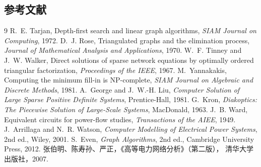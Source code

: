 \subsection{参考文献}
{\renewcommand{\section}[2]{}%
\begin{thebibliography}{9}\small
{} R.~E. Tarjan, Depth-first search and linear graph algorithms,
\emph{SIAM Journal on Computing}, 1972.
 D.~J. Rose, Triangulated graphs and the elimination process,
\emph{Journal of Mathematical Analysis and Applications}, 1970.
 W.~F. Tinney and J.~W. Walker, Direct solutions of sparse
network equations by optimally ordered triangular factorization,
\emph{Proceedings of the IEEE}, 1967.
 M.~Yannakakis, Computing the minimum fill-in is
NP-complete, \emph{SIAM Journal on Algebraic and Discrete Methods}, 1981.
 A.~George and J.~W.-H. Liu, \emph{Computer Solution of
Large Sparse Positive Definite Systems}, Prentice-Hall, 1981.
 G.~Kron, \emph{Diakoptics: The Piecewise Solution of
Large-Scale Systems}, MacDonald, 1963.
 J.~B. Ward, Equivalent circuits for power-flow studies,
\emph{Transactions of the AIEE}, 1949.
 J.~Arrillaga and N.~R. Watson, \emph{Computer Modelling
of Electrical Power Systems}, 2nd ed., Wiley, 2001.
 S.~Even, \emph{Graph Algorithms}, 2nd ed., Cambridge
University Press, 2012.
 张伯明、陈寿孙、严正，《高等电力网络分析》（第二版），
清华大学出版社，2007.
\end{thebibliography}}
